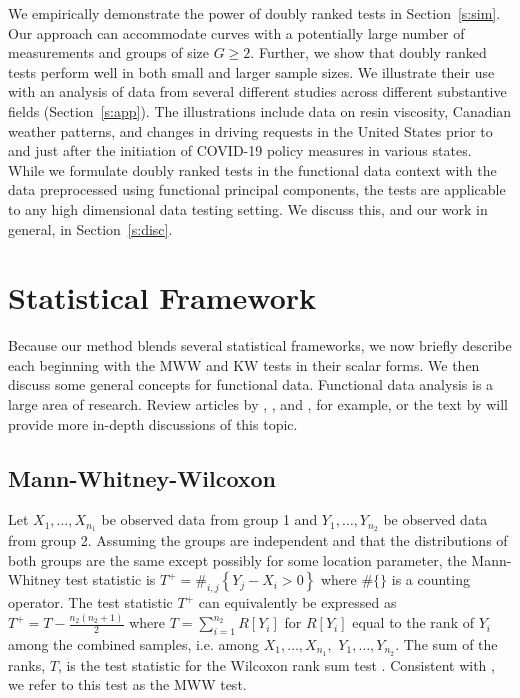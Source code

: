 \documentclass[12pt]{article}
\theoremstyle{plain}
\begin{document}
	We empirically demonstrate the power of doubly ranked tests in Section~\ref{s:sim}. Our approach can accommodate curves with a potentially large number of measurements and groups of size $G \geq 2$. Further, we show that doubly ranked tests perform well in both small and larger sample sizes. We illustrate their use with an analysis of data from several different studies across different substantive fields (Section~\ref{s:app}). The illustrations include data on resin viscosity, Canadian weather patterns, and changes in driving requests in the United States prior to and just after the initiation of COVID-19 policy measures in various states. While we formulate doubly ranked tests in the functional data context with the data preprocessed using functional principal components, the tests are applicable to any high dimensional data testing setting. We discuss this, and our work in general, in Section~\ref{s:disc}.
		
	\section{Statistical Framework}
	\label{s:statframe}

	Because our method blends several statistical frameworks, we now briefly describe each beginning with the MWW and KW tests in their scalar forms. We then discuss some general concepts for functional data. Functional data analysis is a large area of research. Review articles by \cite{Morris2015}, \cite{Wang2016}, and \cite{Greven2017}, for example, or the text by \cite{Ramsay2005} will provide more in-depth discussions of this topic.
	
	\subsection{Mann-Whitney-Wilcoxon}
	
	Let $X_1, \ldots, X_{n_1}$ be observed data from group 1 and $Y_1, \ldots, Y_{n_2}$ be observed data from group 2. Assuming the groups are independent and that the distributions of both groups are the same except possibly for some location parameter, the Mann-Whitney \citep{MannWhitney1947,Kloke2015} test statistic is $T^+ = \#_{i,j}\left\{ Y_j - X_i > 0 \right\}$ where $\#\{\}$ is a counting operator. The test statistic $T^+$ can equivalently be expressed as $T^+ = T - \frac{n_2(n_2 + 1)}{2}$ where $T = \sum_{i=1}^{n_2} R[Y_i]$ for $R[Y_i]$ equal to the rank of $Y_i$ among the combined samples, i.e. among $X_1, \ldots, X_{n_1},$ $Y_1, \ldots, Y_{n_2}$. The sum of the ranks, $T$, is the test statistic for the Wilcoxon rank sum test \citep{Wilcoxon1945,Kruskal1957,Kloke2015}. Consistent with \cite{Kloke2015}, we refer to this test as the MWW test.
	
\end{document}
